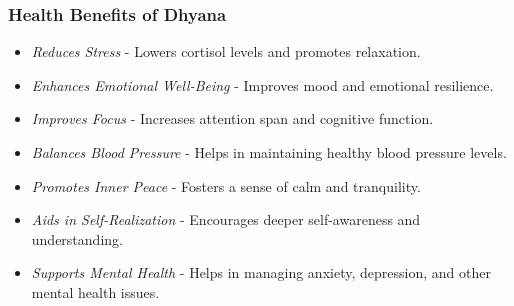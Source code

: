 \begin{frame}[fragile]\frametitle{Health Benefits of Dhyana}

      \begin{itemize}
		\item \textit{Reduces Stress} - Lowers cortisol levels and promotes relaxation.
		\item \textit{Enhances Emotional Well-Being} - Improves mood and emotional resilience.
		\item \textit{Improves Focus} - Increases attention span and cognitive function.
		\item \textit{Balances Blood Pressure} - Helps in maintaining healthy blood pressure levels.
		\item \textit{Promotes Inner Peace} - Fosters a sense of calm and tranquility.
		\item \textit{Aids in Self-Realization} - Encourages deeper self-awareness and understanding.
		\item \textit{Supports Mental Health} - Helps in managing anxiety, depression, and other mental health issues.
	  \end{itemize}

\end{frame}

